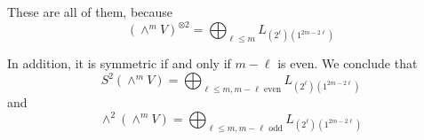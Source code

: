 \documentclass[11pt, headheight=30pt]{scrartcl}
\begin{document}
These are all of them, because
\[
    (\wedge^m V)^{\otimes 2} = \bigoplus_{\ell\leq m } L_{(2^{\ell})(1^{2m - 2\ell})}
\]

In addition, it is symmetric if and only if $m - \ell$ is even. We conclude that
\[
    S^2(\wedge^m V) = \bigoplus_{\ell\leq m, m - \ell \text{ even}} L_{(2^{\ell})(1^{2m - 2\ell})}
\]
and
\[
    \wedge^2(\wedge^m V) = \bigoplus_{\ell\leq m, m - \ell \text{ odd}} L_{(2^{\ell})(1^{2m - 2\ell})}
\]
\end{document}
